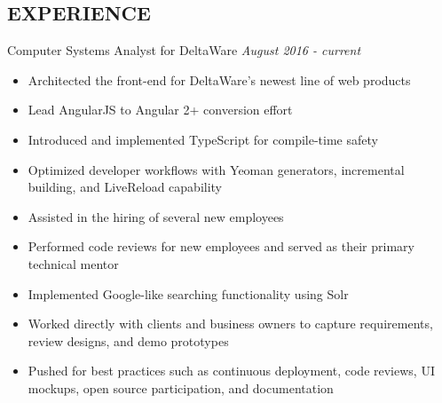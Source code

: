 \documentclass{nfriend-resume}
\begin{document}
\begin{resume}
\section{EXPERIENCE}
{\semibf Computer Systems Analyst} for {\semibf DeltaWare} \hfill \textit{\color{gray}August 2016 - current}\\
\begin{itemize}
    \item{Architected the front-end for DeltaWare’s newest line of web products}
    \item{Lead AngularJS to Angular 2+ conversion effort}
    \item{Introduced and implemented TypeScript for compile-time safety}
    \item{Optimized developer workflows with Yeoman generators, incremental building, and LiveReload capability}
    \item{Assisted in the hiring of several new employees}
    \item{Performed code reviews for new employees and served as their primary technical mentor}
    \item{Implemented Google-like searching functionality using Solr}
    \item{Worked directly with clients and business owners to capture requirements, review designs, and demo prototypes}
    \item{Pushed for best practices such as continuous deployment, code reviews, UI mockups, open source participation, and documentation}
\end{itemize} 

\end{resume}
\end{document}
